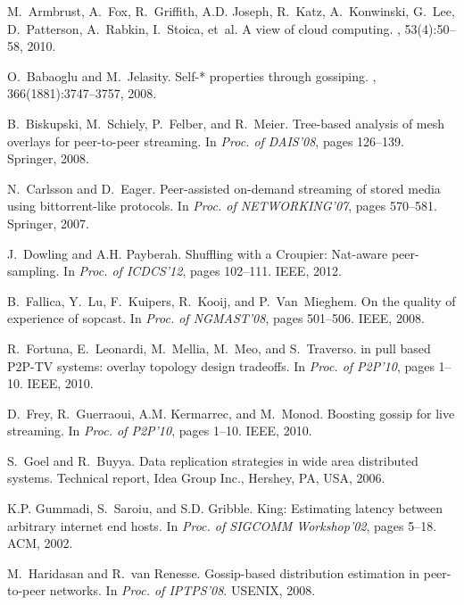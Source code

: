 {\begin{thebibliography}{5}
M.~Armbrust, A.~Fox, R.~Griffith, A.D. Joseph, R.~Katz, A.~Konwinski, G.~Lee,
  D.~Patterson, A.~Rabkin, I.~Stoica, et~al.
\newblock A view of cloud computing.
, 53(4):50--58, 2010.

O.~Babaoglu and M.~Jelasity.
\newblock Self-* properties through gossiping.
, 366(1881):3747--3757, 2008.

B.~Biskupski, M.~Schiely, P.~Felber, and R.~Meier.
\newblock Tree-based analysis of mesh overlays for peer-to-peer streaming.
\newblock In {\em Proc. of DAIS'08}, pages 126--139. Springer, 2008.

N.~Carlsson and D.~Eager.
\newblock Peer-assisted on-demand streaming of stored media using
  bittorrent-like protocols.
\newblock In {\em Proc. of NETWORKING'07}, pages 570--581. Springer, 2007.

J.~Dowling and A.H. Payberah.
\newblock Shuffling with a {Croupier}: Nat-aware peer-sampling.
\newblock In {\em Proc. of ICDCS'12}, pages 102--111. IEEE, 2012.

B.~Fallica, Y.~Lu, F.~Kuipers, R.~Kooij, and P.~Van~Mieghem.
\newblock On the quality of experience of sopcast.
\newblock In {\em Proc. of NGMAST'08}, pages 501--506. IEEE, 2008.

R.~Fortuna, E.~Leonardi, M.~Mellia, M.~Meo, and S.~Traverso.
 in pull based {P2P-TV} systems: overlay topology design
  tradeoffs.
\newblock In {\em Proc. of P2P'10}, pages 1--10. IEEE, 2010.

D.~Frey, R.~Guerraoui, A.M. Kermarrec, and M.~Monod.
\newblock Boosting gossip for live streaming.
\newblock In {\em Proc. of P2P'10}, pages 1--10. IEEE, 2010.

S.~Goel and R.~Buyya.
\newblock Data replication strategies in wide area distributed systems.
\newblock Technical report, Idea Group Inc., Hershey, PA, USA, 2006.

K.P. Gummadi, S.~Saroiu, and S.D. Gribble.
\newblock King: Estimating latency between arbitrary internet end hosts.
\newblock In {\em Proc. of SIGCOMM Workshop'02}, pages 5--18. ACM, 2002.

M.~Haridasan and R.~van Renesse.
\newblock Gossip-based distribution estimation in peer-to-peer networks.
\newblock In {\em Proc. of IPTPS'08}. USENIX, 2008.


\end{thebibliography}}
